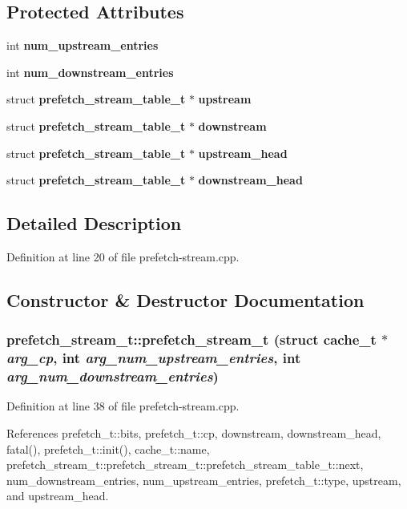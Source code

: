 \subsection*{Protected Attributes}
\begin{CompactItemize}
\item 
int {\bf num\_\-upstream\_\-entries}
\item 
int {\bf num\_\-downstream\_\-entries}
\item 
struct {\bf prefetch\_\-stream\_\-table\_\-t} $\ast$ {\bf upstream}
\item 
struct {\bf prefetch\_\-stream\_\-table\_\-t} $\ast$ {\bf downstream}
\item 
struct {\bf prefetch\_\-stream\_\-table\_\-t} $\ast$ {\bf upstream\_\-head}
\item 
struct {\bf prefetch\_\-stream\_\-table\_\-t} $\ast$ {\bf downstream\_\-head}
\end{CompactItemize}


\subsection{Detailed Description}


Definition at line 20 of file prefetch-stream.cpp.

\subsection{Constructor \& Destructor Documentation}
\subsubsection[{prefetch\_\-stream\_\-t}]{\setlength{\rightskip}{0pt plus 5cm}prefetch\_\-stream\_\-t::prefetch\_\-stream\_\-t (struct {\bf cache\_\-t} $\ast$ {\em arg\_\-cp}, \/  int {\em arg\_\-num\_\-upstream\_\-entries}, \/  int {\em arg\_\-num\_\-downstream\_\-entries})\hspace{0.3cm}{\tt  [inline]}}\label{classprefetch__stream__t_ba2c9e6478c3a6b77cc29a3285202afc}




Definition at line 38 of file prefetch-stream.cpp.

References prefetch\_\-t::bits, prefetch\_\-t::cp, downstream, downstream\_\-head, fatal(), prefetch\_\-t::init(), cache\_\-t::name, prefetch\_\-stream\_\-t::prefetch\_\-stream\_\-t::prefetch\_\-stream\_\-table\_\-t::next, num\_\-downstream\_\-entries, num\_\-upstream\_\-entries, prefetch\_\-t::type, upstream, and upstream\_\-head.
